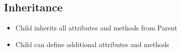 \subsection{Inheritance}
    \begin{itemize}
        \item Child inherits all attributes and methods from Parent
        \item Child can define additional attributes and methods
    \end{itemize}

    